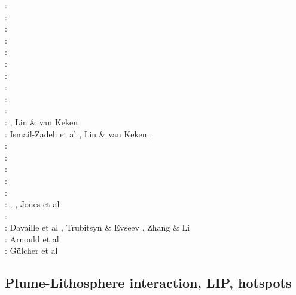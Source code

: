 {\scriptsize
\nineteenseventyseven: \cite{hovo77}\\
\nineteenninetyone: \cite{kell91}\\
\nineteenninetythree: \cite{keki93}\\
\nineteenninetyfour: \cite{nasf94}\cite{fari94}\cite{leka94b}\cite{hayu94}\\
\nineteenninetyseven: \cite{vank97}\cite{keki97}\cite{laym97}\\
\nineteenninetyeight: \cite{thta98}\cite{stoc98}\\
\nineteenninetynine: \cite{lays99}\\
\twothousandtwo: \cite{falt02}\cite{dagl02}\cite{nitg02}\cite{tagh02}\\
\twothousandthree: \cite{safa03}\\
\twothousandfour: \cite{goch04}\cite{scmo04}\\
\twothousandfive: \cite{tagu05}\cite{bung05}\cite{zhon05}, Lin \& van Keken \cite{liva05}\\
\twothousandsix: Ismail-Zadeh et al \cite{isst06}, Lin \& van Keken \cite{liva06a,liva06b}, 
\cite{zhon06}\cite{mita06}\cite{nokm06}\cite{qufo06}
      \cite{keso06}\\
\twothousandseven: \cite{yumh07}\cite{ogaw07}\\
\twothousandnine: \cite{vavl09}\cite{bogj09}\cite{faho09}\cite{scbs09b}\\
\twothousandeleven: \cite{toyu11}\cite{talz11}\cite{burk11}\cite{memm11}\cite{dalt11}\cite{tree11}\\
\twothousandthirteen: \cite{dagm13}\cite{madd13}\cite{ande13}\cite{vadv13}\\
\twothousandfifteen: \cite{daso15}\cite{hafg15}\\
\twothousandsixteen: \cite{kili16}, \cite{dannbergphd}, Jones et al \cite{jodc16}\\
\twothousandseventeen: \cite{moyu17}\cite{lizh17}\\
\twothousandeighteen: Davaille et al \cite{dacc18}, Trubitsyn \& Evseev \cite{trev18}, Zhang \& Li \cite{zhli18}\\
\twothousandnineteen: Arnould et al \cite{argc19}\\
\twothousandtwenty: G{\"u}lcher et al \cite{gugm20}
}

\subsection{Plume-Lithosphere interaction, LIP, hotspots}

